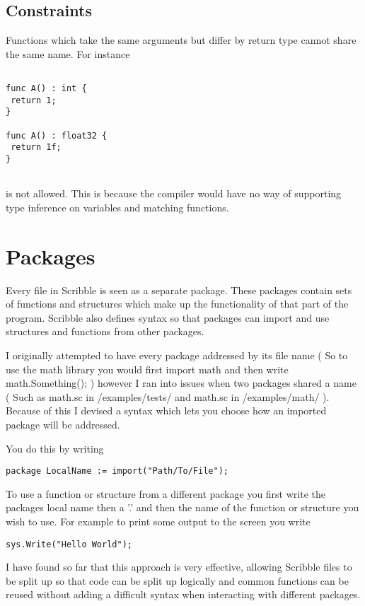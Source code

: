 \documentclass[]{final_report}
\begin{document}
\subsection{Constraints}

Functions which take the same arguments but differ by return type cannot share the same name. For instance

\begin{verbatim}

func A() : int {
 return 1;
}

func A() : float32 {
 return 1f;
}
 
\end{verbatim}

is not allowed. This is because the compiler would have no way of supporting type inference on variables and matching functions.

\section{Packages}

Every file in Scribble is seen as a separate package. These packages contain sets of functions and structures which make up the functionality of that part of the program. Scribble also defines syntax so that packages can import and use structures and functions from other packages.

I originally attempted to have every package addressed by its file name ( So to use the math library you would first import math and then write math.Something();  ) however I ran into issues when two packages shared a name ( Such as math.sc in /examples/tests/ and math.sc in /examples/math/ ). Because of this I devised a syntax which lets you choose how an imported package will be addressed. 

You do this by writing
\begin{verbatim}
package LocalName := import("Path/To/File");
\end{verbatim}

To use a function or structure from a different package you first write the packages local name then a '.' and then the name of the function or structure you wish to use. For example to print some output to the screen you write 
\begin{verbatim}sys.Write("Hello World");\end{verbatim}

I have found so far that this approach is very effective, allowing Scribble files to be split up so that code can be split up logically and common functions can be reused without adding a difficult syntax when interacting with different packages.
\end{document}
